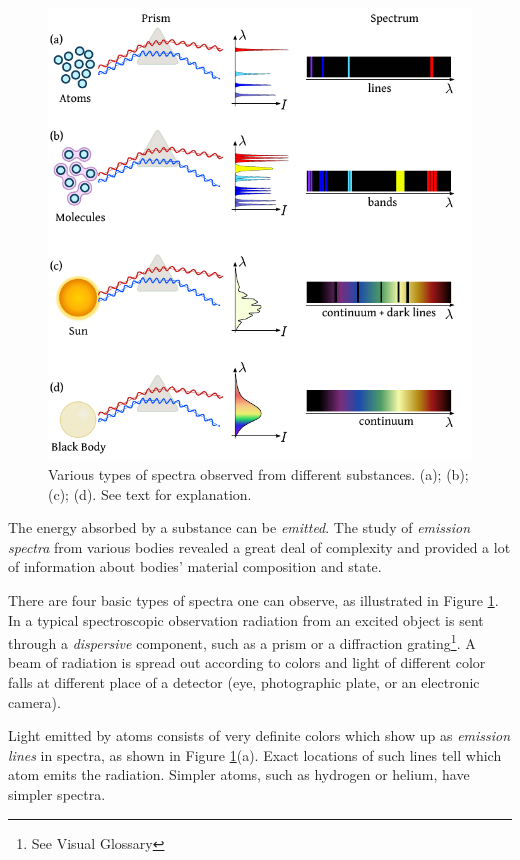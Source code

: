 \begin{figure}[htbp]
	\centering
	\includegraphics[scale=1.0]{spectraTypes}
	\caption{Various types of spectra observed from different substances. (a); (b); (c); (d). See text for explanation.}
	\label{fig:spectraTypes}
\end{figure}


The energy absorbed by a substance can be \emph{emitted}. The study of \emph{emission spectra} from various bodies revealed a great deal of complexity and provided a lot of information about bodies' material composition and state. 

There are four basic types of spectra one can observe, as illustrated in Figure \ref{fig:spectraTypes}. In a typical spectroscopic observation radiation from an excited object is sent through a \emph{dispersive} component, such as a prism or a diffraction grating\footnote{See Visual Glossary}. A beam of radiation is spread out according to colors and light of different color falls at different place of a detector (eye, photographic plate, or an electronic camera).

Light emitted by atoms consists of very definite colors which show up as \emph{emission lines} in spectra, as shown in Figure \ref{fig:spectraTypes}(a). Exact locations of such lines tell which atom emits the radiation. Simpler atoms, such as hydrogen or helium, have simpler spectra.

